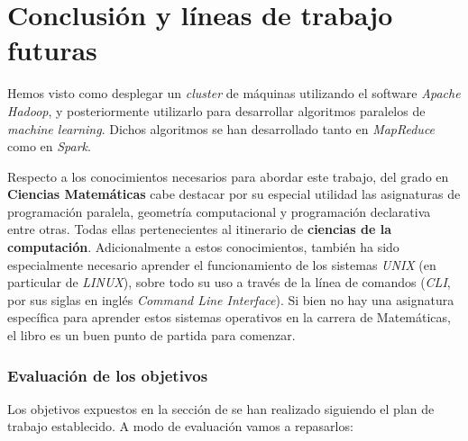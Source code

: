 \chapter*{Conclusión y líneas de trabajo futuras}
Hemos visto como desplegar un \textit{cluster} de máquinas utilizando el software  \textit{Apache Hadoop}, 
y posteriormente utilizarlo para desarrollar algoritmos paralelos de \textit{machine learning}. Dichos algoritmos
se han desarrollado tanto en \textit{MapReduce} como en \textit{Spark}.

Respecto a los conocimientos necesarios para abordar este trabajo, del grado en \textbf{Ciencias Matemáticas}
cabe destacar por su especial utilidad las asignaturas de programación paralela, geometría computacional y 
programación declarativa entre otras. Todas ellas pertenecientes al itinerario de \textbf{ciencias de la computación}.
Adicionalmente a estos conocimientos, también ha sido especialmente necesario aprender el funcionamiento
de los sistemas \textit{UNIX} (en particular de \textit{LINUX}), sobre todo su uso a través de la línea de comandos 
(\textit{CLI}, por sus siglas en inglés \textit{Command Line Interface}). 
Si bien no hay una asignatura específica para aprender estos sistemas operativos en la carrera de Matemáticas, 
el libro \cite{unix_programming_environment} es un buen punto de partida para comenzar.

\subsection*{Evaluación de los objetivos}
Los objetivos expuestos en la sección de  
se han realizado siguiendo el plan de trabajo establecido. A modo de evaluación vamos a repasarlos:

